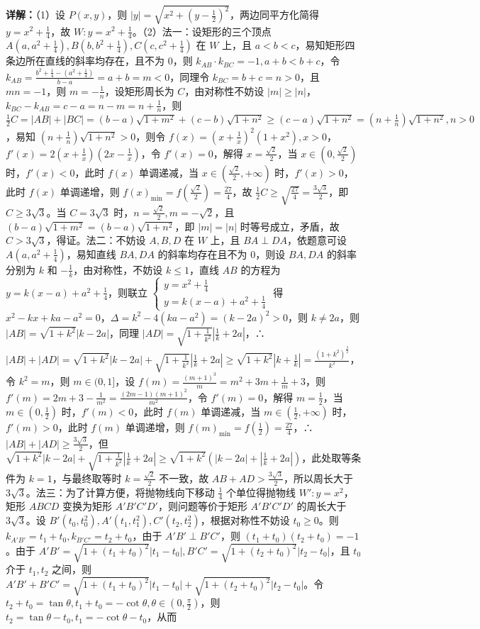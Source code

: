 \begin{question}[points=12]
\begin{solution}
\textbf{详解：}（1）设 $P(x,y)$，则 $|y|=\sqrt{x^2+(y-\frac{1}{2})^2}$，两边同平方化简得 $y=x^2+\frac{1}{4}$，故 $W: y=x^2+\frac{1}{4}$。（2）法一：设矩形的三个顶点 $A(a,a^2+\frac{1}{4}), B(b,b^2+\frac{1}{4}), C(c,c^2+\frac{1}{4})$ 在 $W$ 上，且 $a<b<c$，易知矩形四条边所在直线的斜率均存在，且不为 0，则 $k_{AB}\cdot k_{BC}=-1, a+b<b+c$，令 $k_{AB}=\frac{b^2+\frac{1}{4}-(a^2+\frac{1}{4})}{b-a}=a+b=m<0$，同理令 $k_{BC}=b+c=n>0$，且 $mn=-1$，则 $m=-\frac{1}{n}$，设矩形周长为 $C$，由对称性不妨设 $|m|\geq|n|$，$k_{BC}-k_{AB}=c-a=n-m=n+\frac{1}{n}$，则 $\frac{1}{2}C=|AB|+|BC|=(b-a)\sqrt{1+m^2}+(c-b)\sqrt{1+n^2}\geq (c-a)\sqrt{1+n^2}=(n+\frac{1}{n})\sqrt{1+n^2}, n>0$，易知 $(n+\frac{1}{n})\sqrt{1+n^2}>0$，则令 $f(x)=(x+\frac{1}{x})^2(1+x^2), x>0$，$f'(x)=2(x+\frac{1}{x})(2x-\frac{1}{x})$，令 $f'(x)=0$，解得 $x=\frac{\sqrt{2}}{2}$，当 $x\in(0,\frac{\sqrt{2}}{2})$ 时，$f'(x)<0$，此时 $f(x)$ 单调递减，当 $x\in(\frac{\sqrt{2}}{2},+\infty)$ 时，$f'(x)>0$，此时 $f(x)$ 单调递增，则 $f(x)_{\min}=f(\frac{\sqrt{2}}{2})=\frac{27}{4}$，故 $\frac{1}{2}C\geq \sqrt{\frac{27}{4}}=\frac{3\sqrt{3}}{2}$，即 $C\geq 3\sqrt{3}$。当 $C=3\sqrt{3}$ 时，$n=\frac{\sqrt{2}}{2}, m=-\sqrt{2}$，且 $(b-a)\sqrt{1+m^2}=(b-a)\sqrt{1+n^2}$，即 $|m|=|n|$ 时等号成立，矛盾，故 $C>3\sqrt{3}$，得证。法二：不妨设 $A,B,D$ 在 $W$ 上，且 $BA\perp DA$，依题意可设 $A(a,a^2+\frac{1}{4})$，易知直线 $BA, DA$ 的斜率均存在且不为 0，则设 $BA, DA$ 的斜率分别为 $k$ 和 $-\frac{1}{k}$，由对称性，不妨设 $k\leq 1$，直线 $AB$ 的方程为 $y=k(x-a)+a^2+\frac{1}{4}$，则联立 $\begin{cases} y=x^2+\frac{1}{4} \\ y=k(x-a)+a^2+\frac{1}{4} \end{cases}$ 得 $x^2-kx+ka-a^2=0$，$\Delta=k^2-4(ka-a^2)=(k-2a)^2>0$，则 $k\neq 2a$，则 $|AB|=\sqrt{1+k^2}|k-2a|$，同理 $|AD|=\sqrt{1+\frac{1}{k^2}}|\frac{1}{k}+2a|$，∴ $|AB|+|AD|=\sqrt{1+k^2}|k-2a|+\sqrt{1+\frac{1}{k^2}}|\frac{1}{k}+2a|\geq \sqrt{1+k^2}|k+\frac{1}{k}|=\frac{(1+k^2)^{\frac{3}{2}}}{k^2}$，令 $k^2=m$，则 $m\in(0,1]$，设 $f(m)=\frac{(m+1)^3}{m}=m^2+3m+\frac{1}{m}+3$，则 $f'(m)=2m+3-\frac{1}{m^2}=\frac{(2m-1)(m+1)^2}{m^2}$，令 $f'(m)=0$，解得 $m=\frac{1}{2}$，当 $m\in(0,\frac{1}{2})$ 时，$f'(m)<0$，此时 $f(m)$ 单调递减，当 $m\in(\frac{1}{2},+\infty)$ 时，$f'(m)>0$，此时 $f(m)$ 单调递增，则 $f(m)_{\min}=f(\frac{1}{2})=\frac{27}{4}$，∴ $|AB|+|AD|\geq \frac{3\sqrt{3}}{2}$，但 $\sqrt{1+k^2}|k-2a|+\sqrt{1+\frac{1}{k^2}}|\frac{1}{k}+2a|\geq \sqrt{1+k^2}(|k-2a|+|\frac{1}{k}+2a|)$，此处取等条件为 $k=1$，与最终取等时 $k=\frac{\sqrt{2}}{2}$ 不一致，故 $AB+AD>\frac{3\sqrt{3}}{2}$，所以周长大于 $3\sqrt{3}$。法三：为了计算方便，将抛物线向下移动 $\frac{1}{4}$ 个单位得抛物线 $W': y=x^2$，矩形 $ABCD$ 变换为矩形 $A'B'C'D'$，则问题等价于矩形 $A'B'C'D'$ 的周长大于 $3\sqrt{3}$。设 $B'(t_0,t_0^2), A'(t_1,t_1^2), C'(t_2,t_2^2)$，根据对称性不妨设 $t_0\geq 0$。则 $k_{A'B'}=t_1+t_0, k_{B'C'}=t_2+t_0$，由于 $A'B'\perp B'C'$，则 $(t_1+t_0)(t_2+t_0)=-1$。由于 $A'B'=\sqrt{1+(t_1+t_0)^2}|t_1-t_0|, B'C'=\sqrt{1+(t_2+t_0)^2}|t_2-t_0|$，且 $t_0$ 介于 $t_1,t_2$ 之间，则 $A'B'+B'C'=\sqrt{1+(t_1+t_0)^2}|t_1-t_0|+\sqrt{1+(t_2+t_0)^2}|t_2-t_0|$。令 $t_2+t_0=\tan\theta, t_1+t_0=-\cot\theta, \theta\in(0,\frac{\pi}{2})$，则 $t_2=\tan\theta-t_0, t_1=-\cot\theta-t_0$，从而 
\end{solution}
\end{question}
